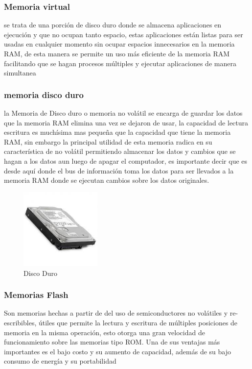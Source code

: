         \subsubsection{Memoria virtual}
        se trata de una porción de disco duro donde se almacena aplicaciones en ejecución y que no ocupan tanto espacio, estas aplicaciones están listas para ser usadas en cualquier momento sin ocupar espacios innecesarios en la memoria RAM, de esta manera se permite un uso más eficiente de la memoria RAM facilitando que se hagan procesos múltiples y ejecutar aplicaciones de manera simultanea 
        
        \subsubsection{memoria disco duro}
        la Memoria de Disco duro o memoria no volátil se encarga de guardar los datos que la memoria RAM elimina una vez se dejaron de usar, la capacidad de lectura  escritura es muchísima mas pequeña que la capacidad que tiene la memoria RAM, sin embargo la principal utilidad de esta memoria radica en su característica de no volátil permitiendo almacenar los datos y cambios que se hagan a los datos aun luego de apagar el computador, es importante decir que es desde aquí donde el bus de información toma los datos para ser llevados a la memoria RAM donde se ejecutan cambios sobre los datos originales. 
        
        \begin{figure}[h]
        \includegraphics[width=4cm]{discoDuro.jpg}
        \centering
        \caption{Disco Duro}
        \label{fig:discoDuro}
        \end{figure}
        
        
        \subsubsection{Memorias Flash}
        Son memorias hechas a partir de del uso de semiconductores no volátiles y re-escribibles, útiles que permite la lectura y escritura de múltiples posiciones de memoria en la misma operación, esto otorga una gran velocidad de funcionamiento sobre las memorias tipo ROM. Una de sus ventajas más importantes es el bajo costo y su aumento de capacidad, además de su bajo consumo de energía y su portabilidad 
        
